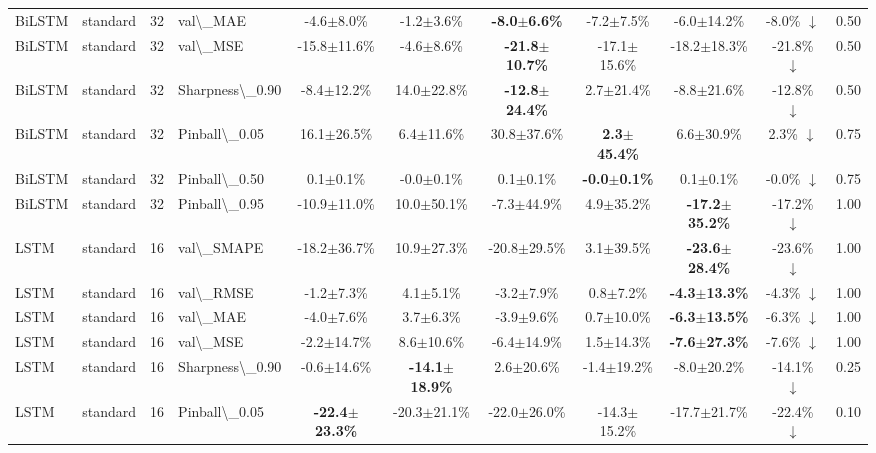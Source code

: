 \begin{table}[t]
\begin{tabular}{l l r l c c c c c c c}
BiLSTM & standard & 32 & val\textbackslash{}_MAE & -4.6$\pm$8.0\% & -1.2$\pm$3.6\% & \textbf{-8.0$\pm$6.6\%} & -7.2$\pm$7.5\% & -6.0$\pm$14.2\% & -8.0\% $\downarrow$ & 0.50 \\
BiLSTM & standard & 32 & val\textbackslash{}_MSE & -15.8$\pm$11.6\% & -4.6$\pm$8.6\% & \textbf{-21.8$\pm$10.7\%} & -17.1$\pm$15.6\% & -18.2$\pm$18.3\% & -21.8\% $\downarrow$ & 0.50 \\
BiLSTM & standard & 32 & Sharpness\textbackslash{}_0.90 & -8.4$\pm$12.2\% & 14.0$\pm$22.8\% & \textbf{-12.8$\pm$24.4\%} & 2.7$\pm$21.4\% & -8.8$\pm$21.6\% & -12.8\% $\downarrow$ & 0.50 \\
BiLSTM & standard & 32 & Pinball\textbackslash{}_0.05 & 16.1$\pm$26.5\% & 6.4$\pm$11.6\% & 30.8$\pm$37.6\% & \textbf{2.3$\pm$45.4\%} & 6.6$\pm$30.9\% & 2.3\% $\downarrow$ & 0.75 \\
BiLSTM & standard & 32 & Pinball\textbackslash{}_0.50 & 0.1$\pm$0.1\% & -0.0$\pm$0.1\% & 0.1$\pm$0.1\% & \textbf{-0.0$\pm$0.1\%} & 0.1$\pm$0.1\% & -0.0\% $\downarrow$ & 0.75 \\
BiLSTM & standard & 32 & Pinball\textbackslash{}_0.95 & -10.9$\pm$11.0\% & 10.0$\pm$50.1\% & -7.3$\pm$44.9\% & 4.9$\pm$35.2\% & \textbf{-17.2$\pm$35.2\%} & -17.2\% $\downarrow$ & 1.00 \\
LSTM & standard & 16 & val\textbackslash{}_SMAPE & -18.2$\pm$36.7\% & 10.9$\pm$27.3\% & -20.8$\pm$29.5\% & 3.1$\pm$39.5\% & \textbf{-23.6$\pm$28.4\%} & -23.6\% $\downarrow$ & 1.00 \\
LSTM & standard & 16 & val\textbackslash{}_RMSE & -1.2$\pm$7.3\% & 4.1$\pm$5.1\% & -3.2$\pm$7.9\% & 0.8$\pm$7.2\% & \textbf{-4.3$\pm$13.3\%} & -4.3\% $\downarrow$ & 1.00 \\
LSTM & standard & 16 & val\textbackslash{}_MAE & -4.0$\pm$7.6\% & 3.7$\pm$6.3\% & -3.9$\pm$9.6\% & 0.7$\pm$10.0\% & \textbf{-6.3$\pm$13.5\%} & -6.3\% $\downarrow$ & 1.00 \\
LSTM & standard & 16 & val\textbackslash{}_MSE & -2.2$\pm$14.7\% & 8.6$\pm$10.6\% & -6.4$\pm$14.9\% & 1.5$\pm$14.3\% & \textbf{-7.6$\pm$27.3\%} & -7.6\% $\downarrow$ & 1.00 \\
LSTM & standard & 16 & Sharpness\textbackslash{}_0.90 & -0.6$\pm$14.6\% & \textbf{-14.1$\pm$18.9\%} & 2.6$\pm$20.6\% & -1.4$\pm$19.2\% & -8.0$\pm$20.2\% & -14.1\% $\downarrow$ & 0.25 \\
LSTM & standard & 16 & Pinball\textbackslash{}_0.05 & \textbf{-22.4$\pm$23.3\%} & -20.3$\pm$21.1\% & -22.0$\pm$26.0\% & -14.3$\pm$15.2\% & -17.7$\pm$21.7\% & -22.4\% $\downarrow$ & 0.10 \\

\end{tabular}
\end{table}
